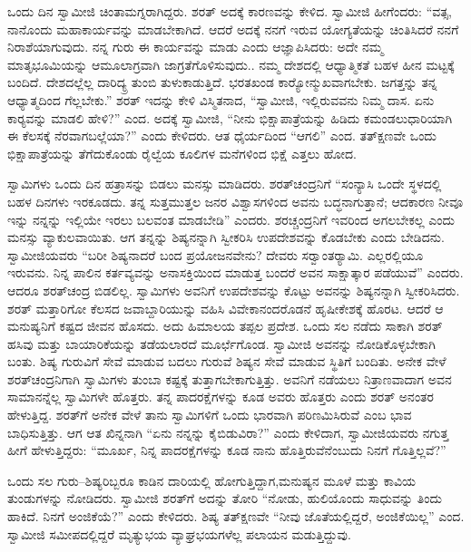  ಒಂದು ದಿನ ಸ್ವಾಮೀಜಿ ಚಿಂತಾಮಗ್ನರಾಗಿದ್ದರು. ಶರತ್ ಅದಕ್ಕೆ ಕಾರಣವನ್ನು ಕೇಳಿದ. ಸ್ವಾಮೀಜಿ ಹೀಗೆಂದರು: “ವತ್ಸ, ನಾನೊಂದು ಮಹಾಕಾರ್ಯವನ್ನು ಮಾಡಬೇಕಾಗಿದೆ. ಆದರೆ ಅದಕ್ಕೆ ನನಗೆ ಇರುವ ಯೋಗ್ಯತೆಯನ್ನು ಚಿಂತಿಸಿದರೆ ನನಗೆ ನಿರಾಶೆಯಾಗುವುದು. ನನ್ನ ಗುರು ಈ ಕಾರ್ಯವನ್ನು ಮಾಡು ಎಂದು ಆಜ್ಞಾಪಿಸಿದರು: ಅದೇ ನಮ್ಮ ಮಾತೃಭೂಮಿಯನ್ನು ಆಮೂಲಾಗ್ರವಾಗಿ ಜಾಗ್ರತೆಗೊಳಿಸುವುದು.. ನಮ್ಮ ದೇಶದಲ್ಲಿ ಆಧ್ಯಾತ್ಮಿಕತೆ ಬಹಳ ಹೀನ ಮಟ್ಟಕ್ಕೆ ಬಂದಿದೆ. ದೇಶದಲ್ಲೆಲ್ಲ ದಾರಿದ್ಯ್ರ ತುಂಬಿ ತುಳುಕಾಡುತ್ತಿದೆ. ಭರತಖಂಡ ಕಾರ‍್ಯೋನ್ಮುಖವಾಗಬೇಕು. ಜಗತ್ತನ್ನು ತನ್ನ ಆಧ್ಯಾತ್ಮದಿಂದ ಗೆಲ್ಲಬೇಕು.” ಶರತ್ ಇದನ್ನು ಕೇಳಿ ವಿಸ್ಮಿತನಾದ, “ಸ್ವಾಮೀಜಿ, ಇಲ್ಲಿರುವವನು ನಿಮ್ಮ ದಾಸ. ಏನು ಕಾರ‍್ಯವನ್ನು ಮಾಡಲಿ ಹೇಳಿ?” ಎಂದ. ಅದಕ್ಕೆ ಸ್ವಾಮೀಜಿ, “ನೀನು ಭಿಕ್ಷಾಪಾತ್ರೆಯನ್ನು ಹಿಡಿದು ಕಮಂಡಲುಧಾರಿಯಾಗಿ ಈ ಕೆಲಸಕ್ಕೆ ನೆರವಾಗಬಲ್ಲೆಯಾ?” ಎಂದು ಕೇಳಿದರು. ಆತ ಧೈರ್ಯದಿಂದ “ಆಗಲಿ” ಎಂದ. ತತ್‍ಕ್ಷಣವೇ ಒಂದು ಭಿಕ್ಷಾಪಾತ್ರೆಯನ್ನು ತೆಗೆದುಕೊಂಡು ರೈಲ್ವೆಯ ಕೂಲಿಗಳ ಮನೆಗಳಿಂದ ಭಿಕ್ಷೆ ಎತ್ತಲು ಹೋದ. 

 ಸ್ವಾಮಿಗಳು ಒಂದು ದಿನ ಹತ್ರಾಸನ್ನು ಬಿಡಲು ಮನಸ್ಸು ಮಾಡಿದರು. ಶರತ್‍ಚಂದ್ರ\-ನಿಗೆ “ಸಂನ್ಯಾಸಿ ಒಂದೇ ಸ್ಥಳದಲ್ಲಿ ಬಹಳ ದಿನಗಳು ಇರಕೂಡದು. ತನ್ನ ಸುತ್ತಮುತ್ತಲ ಜನರ ವಿಶ್ವಾಸಗಳಿಂದ ಅವನು ಬದ್ಧನಾಗುತ್ತಾನೆ; ಆದಕಾರಣ ನೀವೂ ಇನ್ನು ನನ್ನನ್ನು ಇಲ್ಲಿಯೇ ಇರಲು ಬಲವಂತ ಮಾಡಬೇಡಿ” ಎಂದರು. ಶರಚ್ಚಂದ್ರನಿಗೆ ಇವರಿಂದ ಅಗಲಬೇಕಲ್ಲ ಎಂದು ಮನಸ್ಸು ವ್ಯಾಕುಲವಾಯಿತು. ಆಗ ತನ್ನನ್ನು ಶಿಷ್ಯನನ್ನಾಗಿ ಸ್ವೀಕರಿಸಿ ಉಪದೇಶವನ್ನು ಕೊಡಬೇಕು ಎಂದು ಬೇಡಿದನು. ಸ್ವಾಮೀಜಿಯವರು “ಬರೀ ಶಿಷ್ಯನಾದರೆ ಬಂದ ಪ್ರಯೋಜನವೇನು? ದೇವರು ಸರ‍್ವಾಂತರ‍್ಯಾಮಿ. ಎಲ್ಲರಲ್ಲಿಯೂ ಇರುವನು. ನಿನ್ನ ಪಾಲಿನ ಕರ್ತವ್ಯವನ್ನು ಅನಾಸಕ್ತಿಯಿಂದ ಮಾಡುತ್ತ ಬಂದರೆ ಅವನ ಸಾಕ್ಷಾತ್ಕಾರ ಪಡೆಯುವೆ” ಎಂದರು. ಆದರೂ ಶರತ್‍ಚಂದ್ರ ಬಿಡಲಿಲ್ಲ. ಸ್ವಾಮಿಗಳು ಅವನಿಗೆ ಉಪದೇಶವನ್ನು ಕೊಟ್ಟು ಅವನನ್ನು ಶಿಷ್ಯನನ್ನಾಗಿ ಸ್ವೀಕರಿಸಿದರು. ಶರತ್ ಮತ್ತಾರಿಗೋ ಕೆಲಸದ ಜವಾಬ್ದಾರಿಯುನ್ನು ವಹಿಸಿ ವಿವೇಕಾನಂದರೊಡನೆ ಹೃಷೀಕೇಶಕ್ಕೆ ಹೊರಟ. ಆದರೆ ಆ ಮನುಷ್ಯನಿಗೆ ಕಷ್ಟದ ಜೀವನ ಹೊಸದು. ಅದು ಹಿಮಾಲಯ ತಪ್ಪಲ ಪ್ರದೇಶ. ಒಂದು ಸಲ ನಡೆದು ಸಾಕಾಗಿ ಶರತ್ ಹಸಿವು ಮತ್ತು ಬಾಯಾರಿಕೆಯನ್ನು ತಡೆಯಲಾರದೆ ಮೂರ್ಛೆಗೊಂಡ. ಸ್ವಾಮೀಜಿ ಅವನನ್ನು ನೋಡಿಕೊಳ್ಳಬೇಕಾಗಿ ಬಂತು. ಶಿಷ್ಯ ಗುರುವಿಗೆ ಸೇವೆ ಮಾಡುವ ಬದಲು ಗುರುವೆ ಶಿಷ್ಯನ ಸೇವೆ ಮಾಡುವ ಸ್ಥಿತಿಗೆ ಬಂದಿತು. ಅನೇಕ ವೇಳೆ ಶರತ್‍ಚಂದ್ರನಿಗಾಗಿ ಸ್ವಾಮಿಗಳು ತುಂಬಾ ಕಷ್ಟಕ್ಕೆ ತುತ್ತಾಗಬೇಕಾಗುತ್ತಿತ್ತು. ಅವನಿಗೆ ನಡೆಯಲು ನಿತ್ರಾಣವಾದಾಗ ಅವನ ಸಾಮಾನನ್ನೆಲ್ಲ ಸ್ವಾಮಿಗಳೇ ಹೊತ್ತರು. ತನ್ನ ಪಾದರಕ್ಷೆಗಳನ್ನು ಕೂಡ ಅವರು ಹೊತ್ತರು ಎಂದು ಶರತ್ ಅನಂತರ ಹೇಳುತ್ತಿದ್ದ. ಶರತ್‍ಗೆ ಅನೇಕ ವೇಳೆ ತಾನು ಸ್ವಾಮಿಗಳಿಗೆ ಒಂದು ಭಾರವಾಗಿ ಪರಿಣಮಿಸಿರುವೆ ಎಂಬ ಭಾವ ಬಾಧಿಸುತ್ತಿತ್ತು. ಆಗ ಆತ ಖಿನ್ನನಾಗಿ “ಏನು ನನ್ನನ್ನು ಕೈಬಿಡುವಿರಾ?” ಎಂದು ಕೇಳಿದಾಗ, ಸ್ವಾಮೀಜಿಯವರು ನಗುತ್ತ ಹೀಗೆ ಹೇಳುತ್ತಿದ್ದರು: “ಮೂರ್ಖ, ನಿನ್ನ ಪಾದರಕ್ಷೆಗಳನ್ನು ಕೂಡ ನಾನು ಹೊತ್ತಿರುವೆನೆಂಬುದು ನಿನಗೆ ಗೊತ್ತಿಲ್ಲವೆ?” 

 ಒಂದು ಸಲ ಗುರು–ಶಿಷ್ಯರಿಬ್ಬರೂ ಕಾಡಿನ ದಾರಿಯಲ್ಲಿ ಹೋಗುತ್ತಿದ್ದಾಗ,\break ಮನುಷ್ಯನ ಮೂಳೆ ಮತ್ತು ಕಾವಿಯ ತುಂಡುಗಳನ್ನು ನೋಡಿದರು. ಸ್ವಾಮೀಜಿ ಶರತ್‍ಗೆ ಅದನ್ನು ತೋರಿ “ನೋಡು, ಹುಲಿಯೊಂದು ಸಾಧುವನ್ನು ತಿಂದು ಹಾಕಿದೆ. ನಿನಗೆ ಅಂಜಿಕೆಯೆ?” ಎಂದು ಕೇಳಿದರು. ಶಿಷ್ಯ ತತ್‍ಕ್ಷಣವೇ “ನೀವು ಜೊತೆಯಲ್ಲಿದ್ದರೆ, ಅಂಜಿಕೆಯಿಲ್ಲ” ಎಂದ. ಸ್ವಾಮೀಜಿ ಸಮೀಪದಲ್ಲಿದ್ದರೆ ಮೃತ್ಯುಭಯ ವ್ಯಾಘ್ರಭಯಗಳೆಲ್ಲ ಪಲಾಯನ ಮಡುತ್ತಿದ್ದುವು. 

